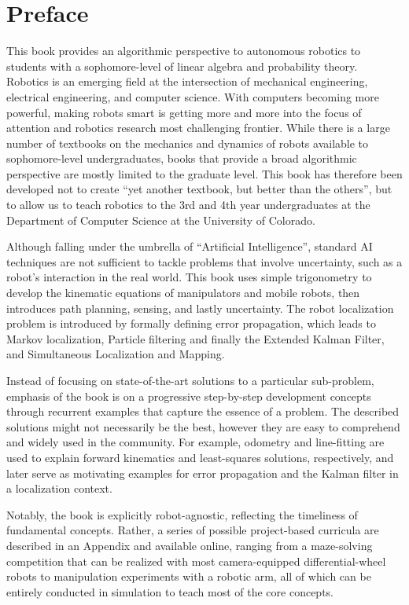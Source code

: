 \documentclass[paper=7in:9in,pagesize=pdftex,11pt,twoside,openright]{scrbook}
\begin{document}
\tableofcontents

\chapter*{Preface}

This book provides an algorithmic perspective to autonomous robotics to students with a sophomore-level of linear algebra and probability theory. Robotics is an emerging field at the intersection of mechanical engineering, electrical engineering, and computer science. With computers becoming more powerful, making robots smart is getting more and more into the focus of attention and robotics research most challenging frontier. While there is a large number of textbooks on the mechanics and dynamics of robots available to sophomore-level undergraduates, books that provide a broad algorithmic perspective are mostly limited to the graduate level. This book has therefore been developed not to create ``yet another textbook, but better than the others'', but to allow us to teach robotics to the 3rd and 4th year undergraduates at the Department of Computer Science at the University of Colorado.

Although falling under the umbrella of ``Artificial Intelligence'', standard AI techniques are not sufficient to tackle problems that involve uncertainty, such as a robot's interaction in the real world. This book uses simple trigonometry to develop the kinematic equations of manipulators and mobile robots, then introduces path planning, sensing, and lastly uncertainty. The robot localization problem is introduced by formally defining error propagation, which leads to Markov localization, Particle filtering and finally the Extended Kalman Filter, and Simultaneous Localization and Mapping.

Instead of focusing on state-of-the-art solutions to a particular sub-problem, emphasis of the book is on a progressive step-by-step development concepts through recurrent examples that capture the essence of a problem. The described solutions might not necessarily be the best, however they are easy to comprehend and widely used in the community. For example, odometry and line-fitting are used to explain forward kinematics and least-squares solutions, respectively, and later serve as motivating examples for error propagation and the Kalman filter in a localization context.

Notably, the book is explicitly robot-agnostic, reflecting the timeliness of fundamental concepts. Rather, a series of possible project-based curricula are described in an Appendix and available online, ranging from a maze-solving competition that can be realized with most camera-equipped differential-wheel robots to manipulation experiments with a robotic arm, all of which can be entirely conducted in simulation to teach most of the core concepts.
\end{document}
